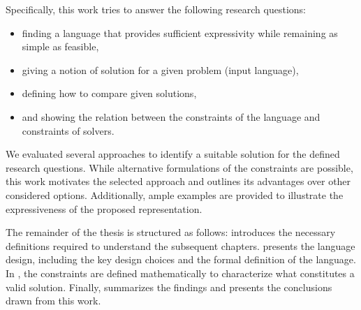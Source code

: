 Specifically, this work tries to answer the following research questions:
\begin{itemize}
      \item finding a language that provides sufficient expressivity while remaining as simple as feasible,
      \item giving a notion of solution for a given problem (input language),
      \item defining how to compare given solutions,
      \item and showing the relation between the constraints of the language and constraints of solvers.
\end{itemize}
We evaluated several approaches to identify a suitable solution for the defined research questions. While alternative formulations of the constraints are possible, this work motivates the selected approach and outlines its advantages over other considered options. Additionally, ample examples are provided to illustrate the expressiveness of the proposed representation.

The remainder of the thesis is structured as follows:  introduces the necessary definitions required to understand the subsequent chapters.  presents the language design, including the key design choices and the formal definition of the language. In , the constraints are defined mathematically to characterize what constitutes a valid solution. Finally,  summarizes the findings and presents the conclusions drawn from this work.

